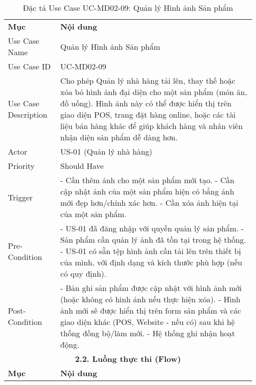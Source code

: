 \begin{longtable}{|m{4cm}|p{11cm}|}
\caption{Đặc tả Use Case UC-MD02-09: Quản lý Hình ảnh Sản phẩm} \label{tab:uc_md02_09} \\
\hline

\endhead %

\hline
\endfoot %

\hline
\endlastfoot %
\multicolumn{2}{|c|}{\textbf{2.1. Tóm tắt (Summary)}} \\
\hline
\textbf{Mục} & \textbf{Nội dung} \\
\hline
Use Case Name & Quản lý Hình ảnh Sản phẩm \\
\hline
Use Case ID & UC-MD02-09 \\
\hline
Use Case Description & Cho phép Quản lý nhà hàng tải lên, thay thế hoặc xóa bỏ hình ảnh đại diện cho một sản phẩm (món ăn, đồ uống). Hình ảnh này có thể được hiển thị trên giao diện POS, trang đặt hàng online, hoặc các tài liệu bán hàng khác để giúp khách hàng và nhân viên nhận diện sản phẩm dễ dàng hơn. \\
\hline
Actor & US-01 (Quản lý nhà hàng) \\
\hline
Priority & Should Have \\
\hline
Trigger & - Cần thêm ảnh cho một sản phẩm mới tạo. \newline - Cần cập nhật ảnh của một sản phẩm hiện có bằng ảnh mới đẹp hơn/chính xác hơn. \newline - Cần xóa ảnh hiện tại của một sản phẩm. \\
\hline
Pre-Condition & - US-01 đã đăng nhập với quyền quản lý sản phẩm. \newline - Sản phẩm cần quản lý ảnh đã tồn tại trong hệ thống. \newline - US-01 có sẵn tệp hình ảnh cần tải lên trên thiết bị của mình, với định dạng và kích thước phù hợp (nếu có quy định). \\
\hline
Post-Condition & - Bản ghi sản phẩm được cập nhật với hình ảnh mới (hoặc không có hình ảnh nếu thực hiện xóa). \newline - Hình ảnh mới sẽ được hiển thị trên form sản phẩm và các giao diện khác (POS, Website - nếu có) sau khi hệ thống đồng bộ/làm mới. \newline - Hệ thống ghi nhận hoạt động. \\
\hline
\multicolumn{2}{|c|}{\textbf{2.2. Luồng thực thi (Flow)}} \\
\hline
\textbf{Mục} & \textbf{Nội dung} \\

\end{longtable}
